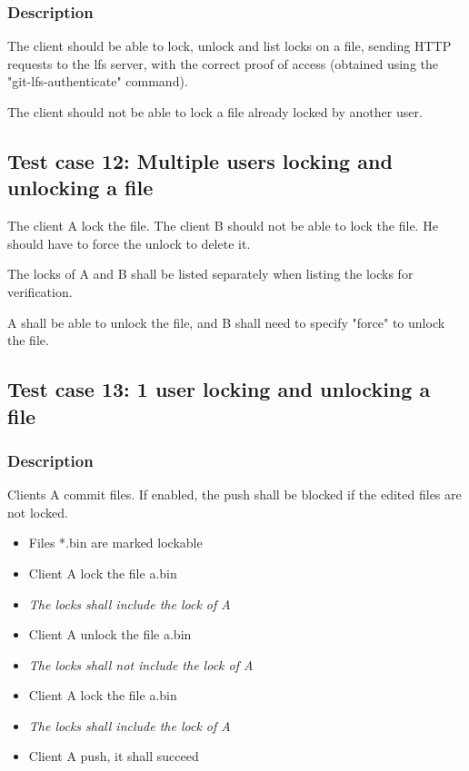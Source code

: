 \subsubsection{Description}

The client should be able to lock, unlock and list locks on a file, sending HTTP requests to the lfs server, with the correct proof of access (obtained using the "git-lfs-authenticate" command).

The client should not be able to lock a file already locked by another user.

\subsection{Test case 12: Multiple users locking and unlocking a file}

The client A lock the file. The client B should not be able to lock the file. He should have to force the unlock to delete it. 

The locks of A and B shall be listed separately when listing the locks for verification. 

A shall be able to unlock the file, and B shall need to specify "force" to unlock the file.

\subsection{Test case 13: 1 user locking and unlocking a file}

\subsubsection{Description}

Clients A commit files. If enabled, the push shall be blocked if the edited files are not locked. 

\begin{itemize}
    \item Files *.bin are marked lockable
    \item Client A lock the file a.bin
    \item \textit{The locks shall include the lock of A}
    \item Client A unlock the file a.bin
    \item \textit{The locks shall not include the lock of A}
    \item Client A lock the file a.bin
    \item \textit{The locks shall include the lock of A} 
    \item Client A push, it shall succeed
\end{itemize}

